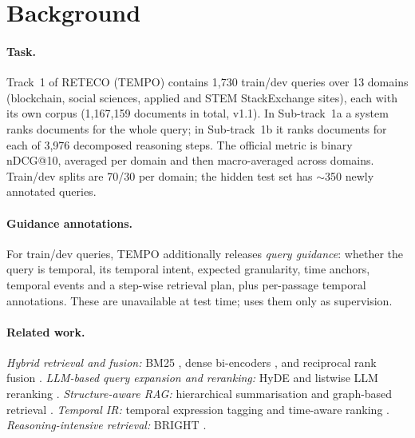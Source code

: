 \section{Background}
\label{sec:background}

\paragraph{Task.} Track~1 of RETECO (TEMPO) contains 1{,}730 train/dev queries over 13 domains
(blockchain, social sciences, applied and STEM StackExchange sites), each with its own corpus
(1{,}167{,}159 documents in total, v1.1). In Sub-track~1a a system ranks documents for the whole
query; in Sub-track~1b it ranks documents for each of 3{,}976 decomposed reasoning steps. The
official metric is binary nDCG@10, averaged per domain and then macro-averaged across domains.
Train/dev splits are 70/30 per domain; the hidden test set has $\sim$350 newly annotated queries.

\paragraph{Guidance annotations.} For train/dev queries, TEMPO additionally releases
\emph{query guidance}: whether the query is temporal, its temporal intent, expected granularity,
time anchors, temporal events and a step-wise retrieval plan, plus per-passage temporal
annotations. These are unavailable at test time; \sys uses them only as supervision.

\paragraph{Related work.}
\emph{Hybrid retrieval and fusion:} BM25 \citep{robertson2009bm25}, dense bi-encoders
\citep{karpukhin2020dpr,xiao2023cpack}, and reciprocal rank fusion \citep{cormack2009rrf}.
\emph{LLM-based query expansion and reranking:} HyDE \citep{gao2023hyde} and listwise LLM
reranking \citep{sun2023rankgpt}. \emph{Structure-aware RAG:} hierarchical summarisation
\citep{sarthi2024raptor} and graph-based retrieval \citep{edge2024graphrag,gutierrez2024hipporag}.
\emph{Temporal IR:} temporal expression tagging \citep{strotgen2010heideltime} and time-aware
ranking \citep{campos2014survey}. \emph{Reasoning-intensive retrieval:} BRIGHT \citep{su2025bright}.
